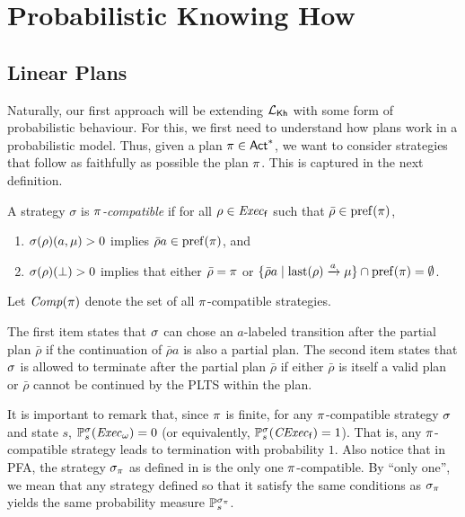 \section{Probabilistic Knowing How}\label{sec:prob}

\subsection{Linear Plans}\label{subsec:prob:linear}

Naturally, our first approach will be extending ${\mathcal{L}_{{\mathsf{Kh}}}}$ with some
form of probabilistic behaviour.  For this, we first need to
understand how plans work in a probabilistic model.
%
Thus, given a plan $\pi\in{\rm \sf Act}^*$, we want to consider
strategies that follow as faithfully as possible the plan
$\pi$. This is captured in the next definition.

\begin{definition}\label{def:plan:compat}
  A strategy $\sigma$ is \emph{$\pi$-compatible} if for all
  $\rho\in\mathit{Exec}_{\mathsf{f}}$ such that $\bar{\rho}\in\mathrm{pref}(\pi)$,
  \begin{enumerate}
  \item%
    $\sigma(\rho)(a,\mu)>0$ implies $\bar{\rho}a\in\mathrm{pref}(\pi)$, and
  \item%
    $\sigma(\rho)(\bot)>0$ implies that either
    $\bar{\rho}=\pi$ or
    $\{\bar{\rho}a\mid{\mathrm{last}(\rho)\xrightarrow{a}\mu}\}\cap\mathrm{pref}(\pi) = \emptyset$. 
  \end{enumerate}
  Let $\mathit{Comp}(\pi)$ denote the set of all $\pi$-compatible
  strategies.
\end{definition}
%
The first item states that $\sigma$ can chose an $a$-labeled
transition after the partial plan $\bar{\rho}$ if the continuation of
$\bar{\rho}a$ is also a partial plan.
%
The second item states that $\sigma$ is allowed to terminate after the
partial plan $\bar{\rho}$ if either $\bar{\rho}$ is itself a valid
plan or $\bar{\rho}$ cannot be continued by the PLTS within the plan.

It is important to remark that, since $\pi$ is finite, for any
$\pi$-compatible strategy $\sigma$ and state $s$,
$\mathbb{P}^\sigma_s(\mathit{Exec}_\omega)=0$ (or equivalently,
$\mathbb{P}^\sigma_s(\mathit{CExec}_{\mathsf{f}})=1$).  That is, any $\pi$-compatible
strategy leads to termination with probability $1$.
%
Also notice that in PFA, the strategy $\sigma_\pi$ as defined in
 is the only one $\pi$-compatible.  By
``only one'', we mean that any strategy defined so that it satisfy the
same conditions as $\sigma_\pi$ yields the same probability measure
$\mathbb{P}_s^{\sigma_\pi}$.


